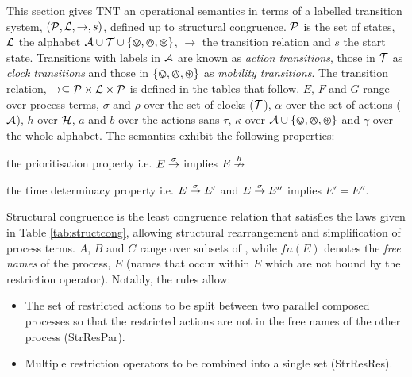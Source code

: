 \documentclass[orivec,envcountsame]{llncs}
\begin{document}
This section gives TNT an operational semantics in terms of a labelled
transition system, $(\text{$\mathcal{P}$}, \text{$\mathcal{L}$}, \rightarrow, s)$, defined
up to structural congruence.  $\text{$\mathcal{P}$}$ is the set of states, $\text{$\mathcal{L}$}$ the
alphabet $\text{$\mathcal{A}$} \cup \text{$\mathcal{T}$} \cup \text{$\{ \varovee, \varowedge , \varoast\}$}$, $\rightarrow$ the
transition relation and $s$ the start state.  Transitions with labels in
$\text{$\mathcal{A}$}$ are known as \emph{action transitions}, those in $\text{$\mathcal{T}$}$ as
\emph{clock transitions} and those in $\text{$\{ \varovee, \varowedge , \varoast\}$}$ as \emph{mobility
transitions}.  The transition relation, $\rightarrow \subseteq
\text{$\mathcal{P}$} \times \text{$\mathcal{L}$} \times \text{$\mathcal{P}$}$ is defined in the tables that follow.
$E$, $F$ and $G$ range over process terms, $\sigma$ and $\rho$ over the
set of clocks ($\text{$\mathcal{T}$}$), $\alpha$ over the set of actions
($\text{$\mathcal{A}$}$), $h$ over $\text{$\mathcal{H}$}$, $a$ and $b$ over the actions
sans $\tau$, $\kappa$ over $\text{$\mathcal{A}$} \cup \text{$\{ \varovee, \varowedge , \varoast\}$}$
and $\gamma$ over the whole alphabet.  The semantics exhibit the
following properties:
\begin{proposition}
the prioritisation property
i.e. $E \stackrel{\sigma}{\rightarrow}$ implies $E \stackrel{h}{\nrightarrow}$ 
\end{proposition}
\begin{proposition}
the time determinacy property i.e. $E \stackrel{\sigma}{\rightarrow} E'$ and $E
\stackrel{\sigma}{\rightarrow} E''$ implies $E' = E''$.
\end{proposition}
Structural congruence is the least congruence relation that satisfies
the laws given in Table \ref{tab:structcong}, allowing structural
rearrangement and simplification of process terms. $A$, $B$
and $C$ range over subsets of \actions, while $fn(E)$ denotes the
\emph{free names} of the process, $E$ (names that occur within $E$ which
are not bound by the restriction operator).  Notably, the rules allow:
\begin{itemize}
\item The set of restricted actions to be split between two parallel
      composed processes so that the restricted actions are not in the
      free names of the other process (StrResPar).
\item Multiple restriction operators to be combined into a single set
      (StrResRes).
\end{itemize}
\end{document}

